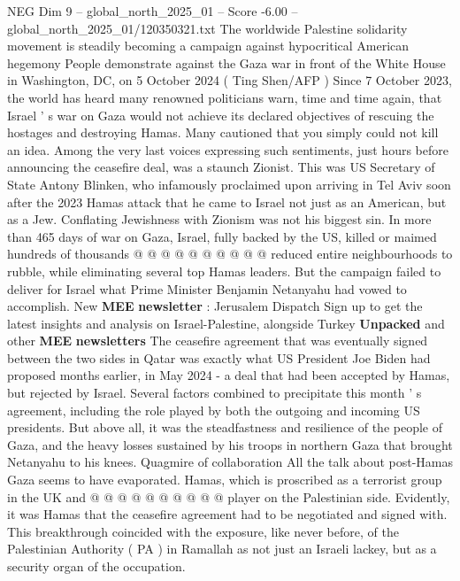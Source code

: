 \begin{textsample}{NEG Dim 9 – global\_north\_2025\_01 – Score -6.00 – global\_north\_2025\_01/120350321.txt}  \label{ex:f9_neg_101}
The worldwide Palestine solidarity movement is steadily becoming a campaign against hypocritical American hegemony People demonstrate against the Gaza war in front of the White House in Washington, DC, on 5 October 2024 ( Ting Shen/AFP ) Since 7 October 2023, the world has heard many renowned politicians warn, time and time again, that Israel ' s war on Gaza would not achieve its declared objectives of rescuing the hostages and destroying Hamas.
Many cautioned that you simply could not kill an idea.
Among the very last voices expressing such sentiments, just hours before announcing the ceasefire deal, was a staunch Zionist.
This was US Secretary of State Antony Blinken, who infamously proclaimed upon arriving in Tel Aviv soon after the 2023 Hamas attack that he came to Israel not just as an American, but as a Jew.
Conflating Jewishness with Zionism was not his biggest sin.
In more than 465 days of war on Gaza, Israel, fully backed by the US, killed or maimed hundreds of thousands @ @ @ @ @ @ @ @ @ @ reduced entire neighbourhoods to rubble, while eliminating several top Hamas leaders.
But the campaign failed to deliver for Israel what Prime Minister Benjamin Netanyahu had vowed to accomplish.
New \textbf{MEE} \textbf{newsletter} : Jerusalem Dispatch Sign up to get the latest insights and analysis on Israel-Palestine, alongside Turkey \textbf{Unpacked} and other \textbf{MEE} \textbf{newsletters} The ceasefire agreement that was eventually signed between the two sides in Qatar was exactly what US President Joe Biden had proposed months earlier, in May 2024 - a deal that had been accepted by Hamas, but rejected by Israel.
Several factors combined to precipitate this month ' s agreement, including the role played by both the outgoing and incoming US presidents.
But above all, it was the steadfastness and resilience of the people of Gaza, and the heavy losses sustained by his troops in northern Gaza that brought Netanyahu to his knees.
Quagmire of collaboration All the talk about post-Hamas Gaza seems to have evaporated.
Hamas, which is proscribed as a terrorist group in the UK and @ @ @ @ @ @ @ @ @ @ player on the Palestinian side.
Evidently, it was Hamas that the ceasefire agreement had to be negotiated and signed with.
This breakthrough coincided with the exposure, like never before, of the Palestinian Authority ( PA ) in Ramallah as not just an Israeli lackey, but as a security organ of the occupation.

\end{textsample}
